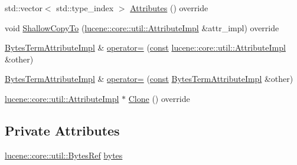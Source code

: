 \begin{DoxyCompactItemize}
\item 
std\+::vector$<$ std\+::type\+\_\+index $>$ \mbox{\hyperlink{classlucene_1_1core_1_1analysis_1_1tokenattributes_1_1BytesTermAttributeImpl_aff915b815335534889b45fa2ce773692}{Attributes}} () override
\item 
void \mbox{\hyperlink{classlucene_1_1core_1_1analysis_1_1tokenattributes_1_1BytesTermAttributeImpl_aafc25a873ed04661a26d6a7b5f6d2b0d}{Shallow\+Copy\+To}} (\mbox{\hyperlink{classlucene_1_1core_1_1util_1_1AttributeImpl}{lucene\+::core\+::util\+::\+Attribute\+Impl}} \&attr\+\_\+impl) override
\item 
\mbox{\hyperlink{classlucene_1_1core_1_1analysis_1_1tokenattributes_1_1BytesTermAttributeImpl}{Bytes\+Term\+Attribute\+Impl}} \& \mbox{\hyperlink{classlucene_1_1core_1_1analysis_1_1tokenattributes_1_1BytesTermAttributeImpl_acfaef15f10ddfec3e2494c6d2176ac73}{operator=}} (\mbox{\hyperlink{ZlibCrc32_8h_a2c212835823e3c54a8ab6d95c652660e}{const}} \mbox{\hyperlink{classlucene_1_1core_1_1util_1_1AttributeImpl}{lucene\+::core\+::util\+::\+Attribute\+Impl}} \&other)
\item 
\mbox{\hyperlink{classlucene_1_1core_1_1analysis_1_1tokenattributes_1_1BytesTermAttributeImpl}{Bytes\+Term\+Attribute\+Impl}} \& \mbox{\hyperlink{classlucene_1_1core_1_1analysis_1_1tokenattributes_1_1BytesTermAttributeImpl_a3d91c14505c1b59ea0372697b87c79f6}{operator=}} (\mbox{\hyperlink{ZlibCrc32_8h_a2c212835823e3c54a8ab6d95c652660e}{const}} \mbox{\hyperlink{classlucene_1_1core_1_1analysis_1_1tokenattributes_1_1BytesTermAttributeImpl}{Bytes\+Term\+Attribute\+Impl}} \&other)
\item 
\mbox{\hyperlink{classlucene_1_1core_1_1util_1_1AttributeImpl}{lucene\+::core\+::util\+::\+Attribute\+Impl}} $\ast$ \mbox{\hyperlink{classlucene_1_1core_1_1analysis_1_1tokenattributes_1_1BytesTermAttributeImpl_a149760a0122009e6b699862553d43b41}{Clone}} () override
\end{DoxyCompactItemize}
\subsection*{Private Attributes}
\begin{DoxyCompactItemize}
\item 
\mbox{\hyperlink{classlucene_1_1core_1_1util_1_1BytesRef}{lucene\+::core\+::util\+::\+Bytes\+Ref}} \mbox{\hyperlink{classlucene_1_1core_1_1analysis_1_1tokenattributes_1_1BytesTermAttributeImpl_aedd53d552069d367ff2ede8111ce1944}{bytes}}
\end{DoxyCompactItemize}
